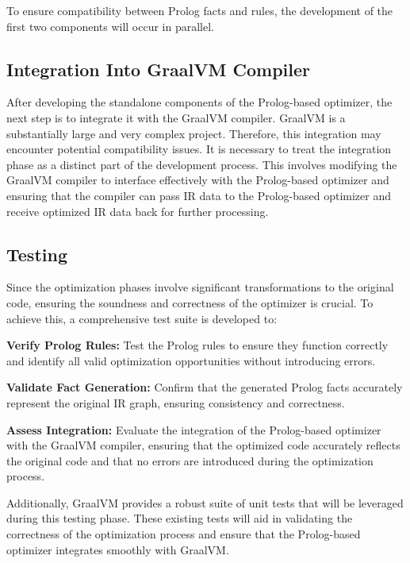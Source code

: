 To ensure compatibility between Prolog facts and rules, the development of the first two components will occur in parallel.

\subsection{Integration Into GraalVM Compiler}
After developing the standalone components of the Prolog-based optimizer, the next step is to integrate it with the GraalVM compiler. GraalVM is a substantially large and very complex project. Therefore, this integration may encounter potential compatibility issues. It is necessary to treat the integration phase as a distinct part of the development process. This involves modifying the GraalVM compiler to interface effectively with the Prolog-based optimizer and ensuring that the compiler can pass IR data to the Prolog-based optimizer and receive optimized IR data back for further processing.

\subsection{Testing}
Since the optimization phases involve significant transformations to the original code, ensuring the soundness and correctness of the optimizer is crucial. To achieve this, a comprehensive test suite is developed to:
\begin{compactitem}
    \item \textbf{Verify Prolog Rules:} Test the Prolog rules to ensure they function correctly and identify all valid optimization opportunities without introducing errors.
    \item \textbf{Validate Fact Generation:} Confirm that the generated Prolog facts accurately represent the original IR graph, ensuring consistency and correctness.
    \item \textbf{Assess Integration:} Evaluate the integration of the Prolog-based optimizer with the GraalVM compiler, ensuring that the optimized code accurately reflects the original code and that no errors are introduced during the optimization process.
\end{compactitem}
Additionally, GraalVM provides a robust suite of unit tests that will be leveraged during this testing phase. These existing tests will aid in validating the correctness of the optimization process and ensure that the Prolog-based optimizer integrates smoothly with GraalVM.

